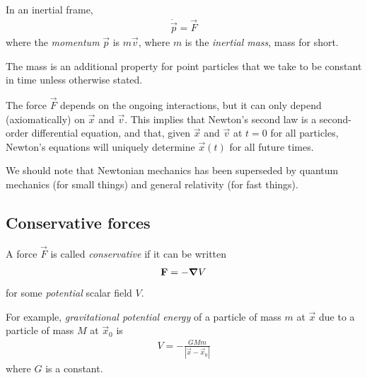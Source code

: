 \documentclass{../../template/note}
\begin{document}
    \begin{theorem}
        In an inertial frame,
        \begin{align*}
            \dot{\vec p} = \vec F
        \end{align*}
        where the \emph{momentum} \(\vec p\) is \(m \vec v\), where \(m\) is the \emph{inertial mass}, mass for short.
    \end{theorem}
    
    The mass is an additional property for point particles that we take to be constant in time unless otherwise stated.

    The force \(\vec F\) depends on the ongoing interactions, but it can only depend (axiomatically) on \(\vec x\) and \(\vec v\). This implies that Newton's second law is a second-order differential equation, and that, given \(\vec x\) and \(\vec v\) at \(t=0\) for all particles, Newton's equations will uniquely determine \(\vec x(t)\) for all future times.

    We should note that Newtonian mechanics has been superseded by quantum mechanics (for small things) and general relativity (for fast things).
    
    \subsection{Conservative forces}

    \begin{definition}
        A force \(\vec F\) is called \emph{conservative} if it can be written
        \begin{align*}
            \vec F = -\grad V
        \end{align*}
        for some \emph{potential} scalar field \(V\).
    \end{definition}
    
    For example, \emph{gravitational potential energy} of a particle of mass \(m\) at \(\vec x\) due to a particle of mass \(M\) at \(\vec x_0\) is
    \begin{align*}
        V = -\frac{GMm}{|\vec x - \vec x_0|}
    \end{align*}
    where \(G\) is a constant.
\end{document}
